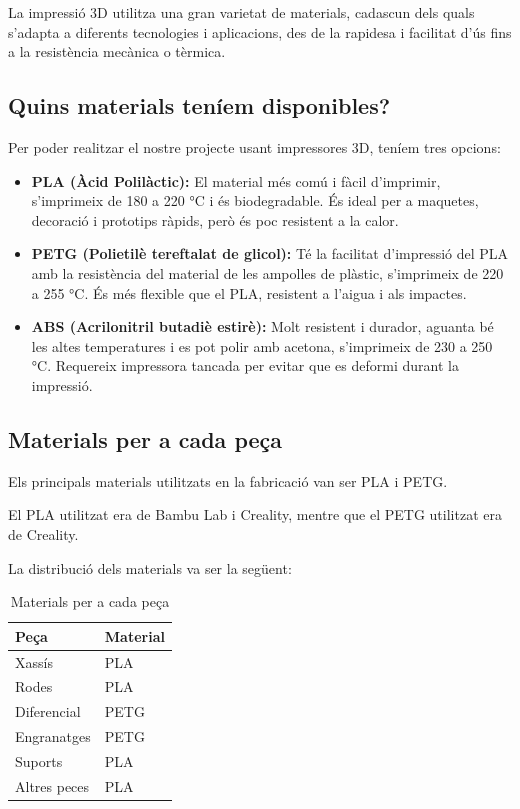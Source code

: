 \documentclass[11pt,a4paper]{article}
\makeatletter
\newif\if@ambseguent
\newcommand{\ambtextseguent}{\global\@ambseguenttrue}
\makeatother
\begin{document}
La impressió 3D utilitza una gran varietat de materials, cadascun dels quals s’adapta a diferents tecnologies i aplicacions, des de la rapidesa i facilitat d'ús fins a la resistència mecànica o tèrmica.

\subsection{Quins materials teníem disponibles?}

Per poder realitzar el nostre projecte usant impressores 3D, teníem tres opcions:
\nopagebreak

\begin{itemize}
  \item \textbf{PLA (Àcid Polilàctic):} El material més comú i fàcil d'imprimir, s’imprimeix de 180 a 220 °C i és biodegradable. És ideal per a maquetes, decoració i prototips ràpids, però és poc resistent a la calor.
  \item \textbf{PETG (Polietilè tereftalat de glicol):} Té la facilitat d’impressió del PLA amb la resistència del material de les ampolles de plàstic, s’imprimeix de 220 a 255 °C. És més flexible que el PLA, resistent a l'aigua i als impactes.
  \item \textbf{ABS (Acrilonitril butadiè estirè):} Molt resistent i durador, aguanta bé les altes temperatures i es pot polir amb acetona, s’imprimeix de 230 a 250 °C. Requereix impressora tancada per evitar que es deformi durant la impressió.
\end{itemize}

\subsection{Materials per a cada peça}

Els principals materials utilitzats en la fabricació van ser PLA i PETG.

El PLA utilitzat era de Bambu Lab i Creality, mentre que el PETG utilitzat era de Creality.

La distribució dels materials va ser la següent:

\begin{table}[H]
  \ambtextseguent
  \centering
  \caption{Materials per a cada peça}\label{taula-5}
  \begin{tabular}{ll}
    \toprule
    \textbf{Peça} & \textbf{Material} \\
    \midrule
    Xassís & PLA \\
    Rodes & PLA \\
    Diferencial & PETG \\
    Engranatges & PETG \\
    Suports & PLA \\
    Altres peces & PLA \\
    \bottomrule
  \end{tabular}
\end{table}
\end{document}
